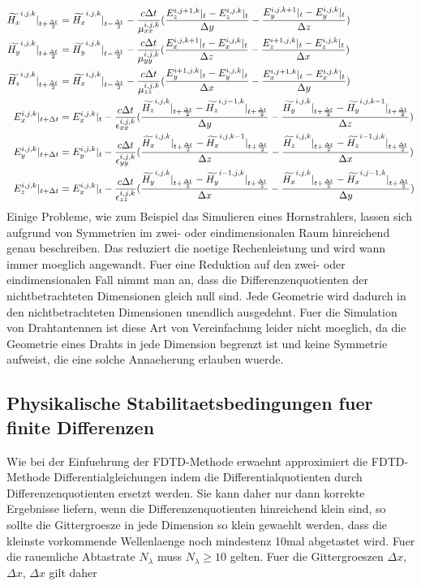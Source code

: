 \documentclass[11pt, ngerman]{article}
\begin{document}
\begin{align}
	\Hf{x}{i,j,k}{+} &= \Hf{x}{i,j,k}{-} - \frac{c\Delta t}{\mu_{xx}^{i,j,k}}(\frac{\Ef{z}{i,j+1,k}{0} - \Ef{z}{i,j,k}{0}}{\Delta y} - \frac{\Ef{y}{i,j,k+1}{0} - \Ef{y}{i,j,k}{0}}{\Delta z}) \label{eq:update_hx_npml}\\
	\Hf{y}{i,j,k}{+} &= \Hf{y}{i,j,k}{-} - \frac{c\Delta t}{\mu_{yy}^{i,j,k}}(\frac{\Ef{x}{i,j,k+1}{0} - \Ef{x}{i,j,k}{0}}{\Delta z} - \frac{\Ef{z}{i+1,j,k}{0} - \Ef{z}{i,j,k}{0}}{\Delta x}) \\
	\Hf{z}{i,j,k}{+} &= \Hf{x}{i,j,k}{-} - \frac{c\Delta t}{\mu_{zz}^{i,j,k}}(\frac{\Ef{y}{i+1,j,k}{0} - \Ef{y}{i,j,k}{0}}{\Delta x} - \frac{\Ef{x}{i,j+1,k}{0} - \Ef{x}{i,j,k}{0}}{\Delta y})\\
	\Ef{x}{i,j,k}{+} &= \Ef{x}{i,j,k}{0} - \frac{c\Delta t}{\epsilon_{xx}^{i,j,k}}(\frac{\Hf{z}{i,j,k}{+} - \Hf{z}{i,j-1,k}{+}}{\Delta y} - \frac{\Hf{y}{i,j,k}{+} - \Hf{y}{i,j,k-1}{+}}{\Delta z}) \label{eq:update_ex_npml}\\
	\Ef{y}{i,j,k}{+} &= \Ef{y}{i,j,k}{0} - \frac{c\Delta t}{\epsilon_{yy}^{i,j,k}}(\frac{\Hf{x}{i,j,k}{+} - \Hf{x}{i,j,k-1}{+}}{\Delta z} - \frac{\Hf{z}{i,j,k}{+} - \Hf{z}{i-1,j,k}{+}}{\Delta x})\\
	\Ef{z}{i,j,k}{+} &= \Ef{x}{i,j,k}{0} - \frac{c\Delta t}{\epsilon_{zz}^{i,j,k}}(\frac{\Hf{y}{i,j,k}{+} - \Hf{y}{i-1,j,k}{+}}{\Delta x} - \frac{\Hf{x}{i,j,k}{+} - \Hf{x}{i,j-1,k}{+}}{\Delta y})
\end{align}
Einige Probleme, wie zum Beispiel das Simulieren eines Hornstrahlers, lassen sich aufgrund von Symmetrien im zwei- oder eindimensionalen Raum hinreichend genau beschreiben.
Das reduziert die noetige Rechenleistung und wird wann immer moeglich angewandt. Fuer eine Reduktion auf den zwei- oder eindimensionalen Fall nimmt man an, dass die
Differenzenquotienten der nichtbetrachteten Dimensionen gleich null sind. Jede Geometrie wird dadurch in den nichtbetrachteten Dimensionen unendlich ausgedehnt.\cite{dimension_reduction}
Fuer die Simulation von Drahtantennen ist diese Art von Vereinfachung leider nicht moeglich, da die Geometrie eines Drahts in jede Dimension begrenzt ist und keine
Symmetrie aufweist, die eine solche Annaeherung erlauben wuerde.

\subsection{Physikalische Stabilitaetsbedingungen fuer finite Differenzen}
Wie bei der Einfuehrung der FDTD-Methode erwaehnt approximiert die FDTD-Methode Differentialgleichungen indem
die Differentialquotienten durch Differenzenquotienten ersetzt werden. Sie kann daher nur dann korrekte Ergebnisse
liefern, wenn die Differenzenquotienten hinreichend klein sind, so sollte die Gittergroesze in jede Dimension
so klein gewaehlt werden, dass die kleinste vorkommende Wellenlaenge noch mindestenz 10mal abgetastet wird.
Fuer die rauemliche Abtastrate \(N_\lambda\) muss \(N_\lambda \geq 10\) gelten\cite{grid_stability_condition}.
Fuer die Gittergroeszen \(\Delta x\), \(\Delta x\), \(\Delta x\) gilt daher
\end{document}
